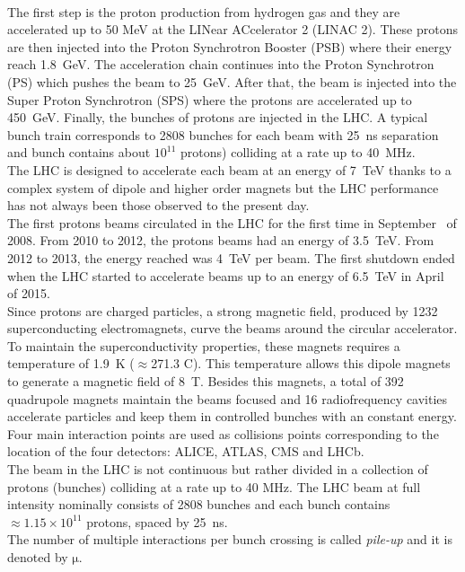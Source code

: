 \\The first step is the proton production from hydrogen gas and they are accelerated up to 50 MeV at the LINear ACcelerator 2 (LINAC 2). These protons are then injected into the 
Proton Synchrotron Booster (PSB) where their energy reach 1.8~GeV.  The acceleration chain continues into the Proton Synchrotron (PS) which pushes the beam
to 25~GeV. After that, the beam is injected into the Super Proton Synchrotron (SPS) where the protons are accelerated up to 450~GeV. Finally, the bunches of protons are injected in the LHC.
A typical bunch train corresponds to 2808 bunches for each beam with 25~ns separation and  bunch contains about $\mathrm{10^{11}}$ protons) colliding at a rate up to 40~MHz. 
\\The LHC is designed to accelerate each beam at an energy of 7~TeV thanks to a complex system of dipole and higher order magnets but the LHC performance has not always been 
those observed to the present day. \\
The first protons beams circulated in the LHC for the first time in September~ of 2008. From 2010 to 2012, the protons
beams had an energy of 3.5~TeV. From 2012 to 2013, the energy reached was 4~TeV per beam. The first shutdown ended when the LHC started to accelerate
beams up to an energy of 6.5~TeV in April~ of 2015.\\
Since protons are charged particles, a strong magnetic field, produced by 1232 superconducting electromagnets, curve the beams around the circular accelerator.
To maintain the superconductivity properties, these magnets requires a temperature of 1.9~K ($\mathrm{\approx}$271.3 \textdegree{}C). 
This temperature allows this dipole magnets to generate a magnetic field of 8~T. Besides this magnets, a total of 392 quadrupole magnets maintain the
beams focused and 16 radiofrequency cavities accelerate particles and keep them in controlled bunches with an constant energy.
Four main interaction points are used as collisions points corresponding to the location of the four detectors: ALICE, ATLAS, CMS and LHCb.\\
The beam in the LHC is not continuous but rather divided in a collection of protons (bunches) colliding at a rate up to 40 MHz. 
The LHC beam at full intensity nominally consists of 2808 bunches and each bunch contains $\mathrm{\approx 1.15 \times10^{11}}$ protons, spaced by 25~ns.\\
The number of multiple interactions per bunch crossing is called \textit{pile-up} and it is denoted by $\mathrm{\mu}$. 
